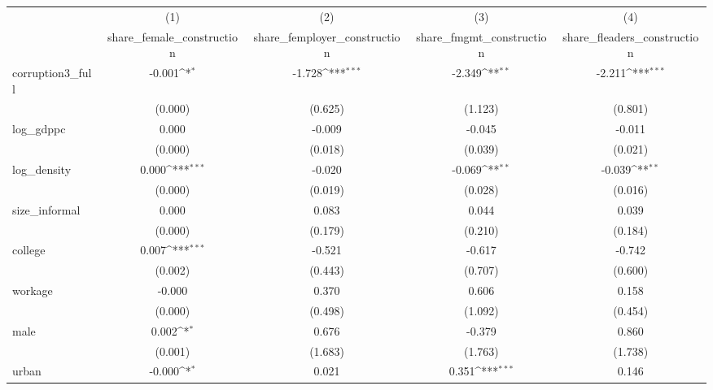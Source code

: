 {
\def\sym#1{\ifmmode^{#1}\else\(^{#1}\)\fi}
\begin{tabular}{l*{4}{c}}
\hline\hline
            &\multicolumn{1}{c}{(1)}&\multicolumn{1}{c}{(2)}&\multicolumn{1}{c}{(3)}&\multicolumn{1}{c}{(4)}\\
            &\multicolumn{1}{c}{share\_female\_construction}&\multicolumn{1}{c}{share\_femployer\_construction}&\multicolumn{1}{c}{share\_fmgmt\_construction}&\multicolumn{1}{c}{share\_fleaders\_construction}\\
\hline
corruption3\_full&      -0.001\sym{*}  &      -1.728\sym{***}&      -2.349\sym{**} &      -2.211\sym{***}\\
            &     (0.000)         &     (0.625)         &     (1.123)         &     (0.801)         \\
[1em]
log\_gdppc   &       0.000         &      -0.009         &      -0.045         &      -0.011         \\
            &     (0.000)         &     (0.018)         &     (0.039)         &     (0.021)         \\
[1em]
log\_density &       0.000\sym{***}&      -0.020         &      -0.069\sym{**} &      -0.039\sym{**} \\
            &     (0.000)         &     (0.019)         &     (0.028)         &     (0.016)         \\
[1em]
size\_informal&       0.000         &       0.083         &       0.044         &       0.039         \\
            &     (0.000)         &     (0.179)         &     (0.210)         &     (0.184)         \\
[1em]
college     &       0.007\sym{***}&      -0.521         &      -0.617         &      -0.742         \\
            &     (0.002)         &     (0.443)         &     (0.707)         &     (0.600)         \\
[1em]
workage     &      -0.000         &       0.370         &       0.606         &       0.158         \\
            &     (0.000)         &     (0.498)         &     (1.092)         &     (0.454)         \\
[1em]
male        &       0.002\sym{*}  &       0.676         &      -0.379         &       0.860         \\
            &     (0.001)         &     (1.683)         &     (1.763)         &     (1.738)         \\
[1em]
urban       &      -0.000\sym{*}  &       0.021         &       0.351\sym{***}&       0.146         \\

\end{tabular}}
